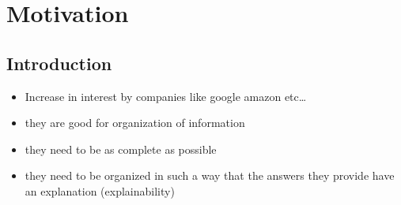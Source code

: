 \chapter{Motivation}\label{chap:motivation}






\section{Introduction}\label{sec:moti-intro}
\begin{itemize}
    \item Increase in interest by companies like google amazon etc\dots
    \item they are good for organization of information
    \item they need to be as complete as possible
    \item they need to be organized in such a way that the answers they provide have an explanation (explainability)
\end{itemize}

